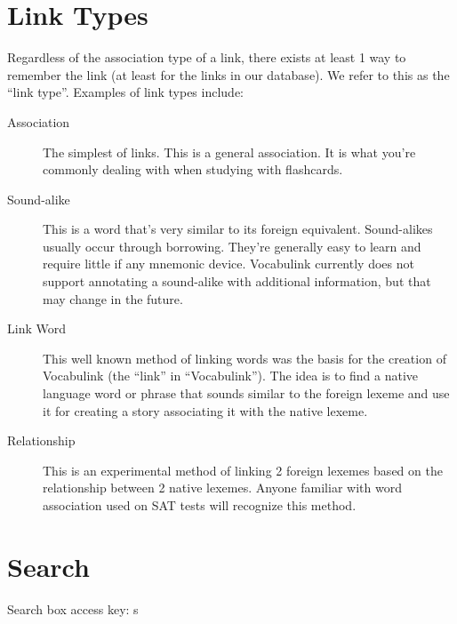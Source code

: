 \section{Link Types}

Regardless of the association type of a link, there exists at least 1 way to
remember the link (at least for the links in our database). We refer to this as
the ``link type''. Examples of link types include:

\begin{description}
\item[Association] The simplest of links. This is a general association. It is
  what you're commonly dealing with when studying with flashcards.
\item[Sound-alike] This is a word that's very similar to its foreign
  equivalent. Sound-alikes usually occur through borrowing. They're generally
  easy to learn and require little if any mnemonic device. Vocabulink currently
  does not support annotating a sound-alike with additional information, but
  that may change in the future.
\item[Link Word] This well known method of linking words was the basis for the
  creation of Vocabulink (the ``link'' in ``Vocabulink''). The idea is to find
  a native language word or phrase that sounds similar to the foreign lexeme
  and use it for creating a story associating it with the native lexeme.
\item[Relationship] This is an experimental method of linking 2 foreign lexemes
  based on the relationship between 2 native lexemes. Anyone familiar with word
  association used on SAT tests will recognize this method.
\end{description}

\section{Search}

Search box access key: s